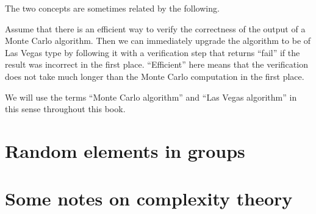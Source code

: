 The two concepts are sometimes related by the following.

\begin{Rem}
Assume that there is an efficient way to verify the correctness of the output
of a Monte Carlo algorithm. Then we can immediately upgrade the
algorithm to be of Las Vegas type by following it with a verification
step that returns ``fail'' if the result was incorrect in the first
place. ``Efficient'' here means that the verification does not take
much longer than the Monte Carlo computation in the first place.
\end{Rem}

We will use the terms ``Monte Carlo algorithm'' and ``Las Vegas
algorithm'' in this sense throughout this book.

\section{Random elements in groups}
\label{randomelts}

\section{Some notes on complexity theory}
\label{sec:complexity}

